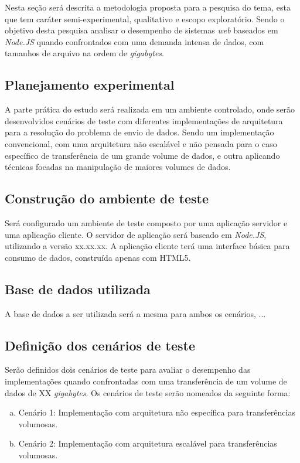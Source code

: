 \documentclass[12pt]{article}
\begin{document}
Nesta seção será descrita a metodologia proposta para a pesquisa do tema, esta que tem caráter semi-experimental, qualitativo
e escopo exploratório. Sendo o objetivo desta pesquisa analisar o desempenho de sistemas
\textit{web} baseados em \textit{Node.JS} quando confrontados com uma demanda intensa de dados, 
com tamanhos de arquivo na ordem de \textit{gigabytes}.


\subsection{Planejamento experimental}

A parte prática do estudo será realizada em um ambiente controlado, onde serão desenvolvidos cenários de teste com diferentes 
implementações de arquitetura para a resolução do problema de envio de dados. Sendo um implementação convencional, com uma
arquitetura não escalável e não pensada para o caso específico de transferência de um grande volume de dados, e outra aplicando
técnicas focadas na manipulação de maiores volumes de dados.


\subsection{Construção do ambiente de teste}

Será configurado um ambiente de teste composto por uma aplicação servidor e uma aplicação cliente.
O servidor de aplicação será baseado em \textit{Node.JS}, utilizando a versão xx.xx.xx. 
A aplicação cliente terá uma interface básica para consumo de dados, construída apenas com HTML5.

\subsection{Base de dados utilizada}

A base de dados a ser utilizada será a mesma para ambos os cenários, ...

\subsection{Definição dos cenários de teste}

Serão definidos dois cenários de teste para avaliar o desempenho das implementações quando confrontadas com uma transferência de
um volume de dados de XX \textit{gigabytes}. Os cenários de teste serão nomeados da seguinte forma:

\begin{enumerate}[a)]
    \item Cenário 1: Implementação com arquitetura não específica para transferências volumosas.
    \item Cenário 2: Implementação com arquitetura escalável para transferências volumosas.
\end{enumerate}
\end{document}
